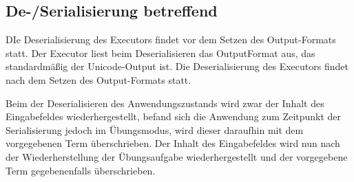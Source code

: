 \documentclass[parskip=full,11pt,openany]{scrreprt}
\begin{document}
\subsection{De-/Serialisierung betreffend}
\begin{itemize}[itemsep=3ex]
	{DIe Deserialisierung des Executors findet vor dem Setzen des Output-Formats statt. Der Executor liest beim Deserialisieren das OutputFormat aus, das standardmäßig der Unicode-Output ist.}
	{Die Deserialisierung des Executors findet nach dem Setzen des Output-Formats statt.}
	
	{Beim der Deserialisieren des Anwendungszustands wird zwar der Inhalt des Eingabefeldes wiederhergestellt, befand sich die Anwendung zum Zeitpunkt der Serialisierung jedoch im Übungsmodus, wird dieser daraufhin mit dem vorgegebenen Term überschrieben.}
	{Der Inhalt des Eingabefeldes wird nun nach der Wiederherstellung der Übungsaufgabe wiederhergestellt und der vorgegebene Term gegebenenfalls überschrieben.}
\end{itemize}
\end{document}
